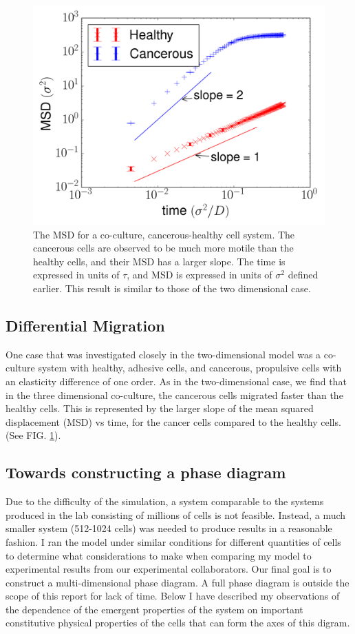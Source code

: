\documentclass[aps,prb,twocolumn,groupedaddress,nofootinbib,floatfix]{revtex4}
\begin{document}
\begin{figure}
  \includegraphics[width=\columnwidth]{images/cocultureMSD.png}
  \caption[cocultureMSD]
    {The MSD for a co-culture, cancerous-healthy cell system. The cancerous cells
    are observed to be much more motile than the healthy cells, and their MSD has a larger slope. The time is expressed in units of $\tau$, and MSD is expressed
    in units of $\sigma^2$ defined earlier. This result is
    similar to those of the two dimensional case\cite{Butcher}.}
  \label{fig:cocultureMSD}
\end{figure}

\subsection{Differential Migration}
One case that was investigated closely in the two-dimensional model was a co-culture system with healthy, adhesive cells, and cancerous, propulsive cells with an elasticity 
difference of one order. As in the two-dimensional case, we find that in the three dimensional co-culture, the cancerous cells migrated faster than the healthy cells. This is represented by the larger
slope of the mean squared displacement (MSD) vs time, for the cancer cells compared to the healthy cells. (See FIG. \ref{fig:cocultureMSD}).

\subsection{Towards constructing a phase diagram}

Due to the difficulty of the simulation, a system comparable to the systems produced in the lab consisting of millions of cells is not feasible.
Instead, a much smaller system (512-1024 cells) was needed to produce results in a reasonable fashion. I ran the model under similar conditions for different quantities of cells to 
determine what considerations to make when comparing my model to experimental results from our experimental collaborators. Our final goal is to construct a multi-dimensional phase diagram. 
A full phase diagram is outside the scope of this report for lack of time. Below I have described my observations of the dependence of the emergent properties of the system on important constitutive 
physical properties of the cells that can form the axes of this digram.
\end{document}
